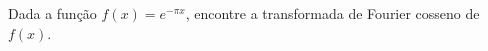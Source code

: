 \linespread{1.5}
Dada a função $f(x) = e^{-\pi x}$, encontre a transformada de Fourier cosseno de $f(x)$.